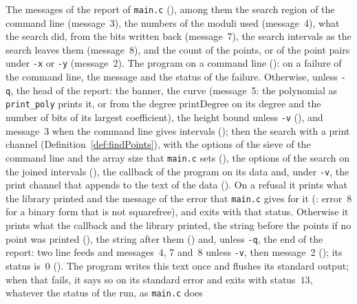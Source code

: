 \begin{definition}\label{def:cliRun}
  \leanok
  The messages of the report of \verb|main.c| (), among them the search
  region of the command line (message~3), the numbers of the moduli used (message~4), what the
  search did, from the bits written back (message~7), the search intervals as the search leaves them
  (message~8), and the count of the points, or of the point pairs under \verb|-x| or \verb|-y|
  (message~2). The program on a command line (): on a failure of the
  command line, the message and the status of the failure. Otherwise, unless \verb|-q|, the head of
  the report: the banner, the curve (message~5: the polynomial as \verb|print_poly| prints it, or
  from the degree $\mathrm{printDegree}$ on its degree and the number of bits of its largest
  coefficient), the height bound unless \verb|-v| (), and message~3 when
  the command line gives intervals (); then the search with a print
  channel (Definition~\ref{def:findPoints}), with the options of the sieve of the command line and
  the array size that \verb|main.c| sets (), the options of the search on
  the joined intervals (), the callback of the program on its data and,
  under \verb|-v|, the print channel that appends to the text of the data
  (). On a refusal it prints what the library printed and the message of
  the error that \verb|main.c| gives for it (: error~8 for a
  binary form that is not squarefree), and exits with that status. Otherwise it prints what the
  callback and the library printed, the string before the points if no point was printed
  (), the string after them () and, unless
  \verb|-q|, the end of the report: two line feeds and messages~4, 7 and~8 unless \verb|-v|, then
  message~2 (); its status is~$0$ (). The
  program writes this text once and flushes its standard output; when that fails, it says so on its
  standard error and exits with status~$13$, whatever the status of the run, as \verb|main.c| does

\end{definition}
